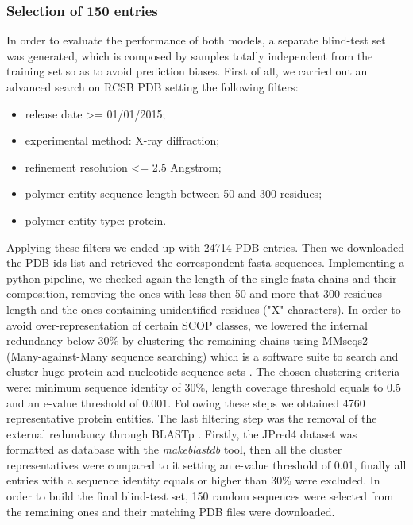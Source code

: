\documentclass[nocrop]{bioinfo}
\begin{document}
\begin{methods}
\subsubsection{Selection of 150 entries}
In order to evaluate the performance of both models, a separate blind-test set was generated, which is composed by samples totally independent from the training set so as to avoid prediction biases. First of all, we carried out an advanced search on RCSB PDB \citep{berman2000protein} setting the following filters:
\begin{itemize}
\item release date >= 01/01/2015;
\item experimental method: X-ray diffraction;
\item refinement resolution <= 2.5 Angstrom;
\item polymer entity sequence length between 50 and 300 residues;
\item polymer entity type: protein.
\end{itemize}
Applying these filters we ended up with 24714 PDB entries. Then we downloaded the PDB ids list and retrieved the correspondent fasta sequences. Implementing a python pipeline, we checked again the length of the single fasta chains and their composition, removing the ones with less then 50 and more that 300 residues length and the ones containing unidentified residues ("X" characters). In order to avoid over-representation of certain SCOP classes, we lowered the internal redundancy below 30\% by clustering the remaining chains using MMseqs2 (Many-against-Many sequence searching) which is a software suite to search and cluster huge protein and nucleotide sequence sets \citep{steinegger2017mmseqs2}. The chosen clustering criteria were: minimum sequence identity of  30\%, length coverage threshold equals to 0.5 and an e-value threshold of 0.001. Following these steps we obtained 4760 representative protein entities. The last filtering step was the removal of the external redundancy through BLASTp \citep{altschul1990basic}. Firstly, the JPred4 dataset was formatted as database with the \textit{makeblastdb} tool, then all the cluster representatives were compared to it setting an e-value threshold of 0.01, finally all entries with a sequence identity equals or higher than 30\% were excluded. In order to build the final blind-test set, 150 random sequences were selected from the remaining ones and their matching PDB files were downloaded.


\end{methods}
\end{document}
